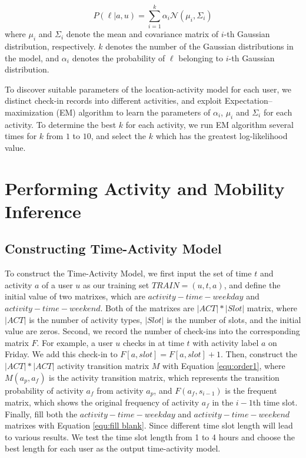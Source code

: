 \begin{equation}
\label{equ:location-activity}
P(\ell | a, u) = \sum_{i=1}^{k} \alpha_{i}\mathcal{N}(\mu_{i}, \Sigma_{i})
\end{equation}
where $\mu_{i}$ and $\Sigma_{i}$ denote the mean and covariance matrix of $i$-th Gaussian distribution, respectively. $k$ denotes the number of the Gaussian distributions in the model, and $\alpha_{i}$ denotes the probability of $\ell$ belonging to $i$-th Gaussian distribution.

To discover suitable parameters of the location-activity model for each user, we distinct check-in records into different activities, and exploit Expectation--maximization (EM) algorithm to learn the parameters of $\alpha_{i}$, $\mu_{i}$ and $\Sigma_{i}$ for each activity. To determine the best $k$ for each activity, we run EM algorithm several times for $k$ from $1$ to $10$, and select the $k$ which has the greatest log-likelihood value.


\section{Performing Activity and Mobility Inference}
\label{sec:4-6}
\subsection{Constructing Time-Activity Model}
To construct the Time-Activity Model, we first input the set of time $t$ and activity $a$ of a user $u$ as our training set $TRAIN = {(u, t, a)}$, and define the initial value of two matrixes, which are $activity-time-weekday$ and $activity-time-weekend$. Both of the matrixes are $|ACT|*|Slot|$ matrix, where $|ACT|$ is the number of activity types, $|Slot|$ is the number of slots, and the initial value are zeros. Second, we record the number of check-ins into the corresponding matrix $F$. For example, a user $u$ checks in at time $t$ with activity label $a$ on Friday. We add this check-in to $F[a,slot] = F[a,slot] + 1$. Then, construct the $|ACT|*|ACT|$ activity transition matrix $M$ with Equation \ref{equ:order1}, where $M(a_p,a_f)$ is the activity transition matrix, which represents the transition probability of activity $a_f$ from activity $a_p$, and $F(a_f , s_{i−1})$ is the frequent matrix, which shows the original frequency of activity $a_f$ in the $i-1$th time slot. Finally, fill both the $activity-time-weekday$ and $activity-time-weekend$ matrixes with Equation \ref{equ:fill blank}. Since different time slot length will lead to various results. We test the time slot length from 1 to 4 hours and choose the best length for each user as the output time-activity model.

